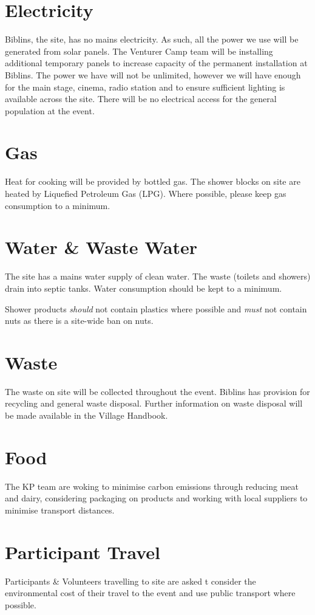 \documentclass[a4paper, 11pt]{report}
\newcommand{\nl}{\newline}
\begin{document}
\section{Electricity}
Biblins, the site, has no mains electricity. As such, all the power we use will be generated from solar panels. The Venturer Camp team will be installing additional temporary panels to increase capacity of the permanent installation at Biblins. The power we have will not be unlimited, however we will have enough for the main stage, cinema, radio station and to ensure sufficient lighting is available across the site. There will be no electrical access for the general population at the event.

\section{Gas}
Heat for cooking will be provided by bottled gas. The shower blocks on site are heated by Liquefied Petroleum Gas (LPG). Where possible, please keep gas consumption to a minimum. 

\section{Water \& Waste Water}
The site has a mains water supply of clean water. The waste (toilets and showers) drain into septic tanks. Water consumption should be kept to a minimum. \nl

Shower products \textit{should} not contain plastics where possible and \textit{must} not contain nuts as there is a site-wide ban on nuts.

\section{Waste}
The waste on site will be collected throughout the event. Biblins has provision for recycling and general waste disposal. Further information on waste disposal will be made available in the Village Handbook. 

\section{Food}
The KP team are woking to minimise carbon emissions through reducing meat and dairy, considering packaging on products and working with local suppliers to minimise transport distances.

\section{Participant Travel}
Participants \& Volunteers travelling to site are asked t consider the environmental cost of their travel to the event and use public transport where possible. 
\end{document}
